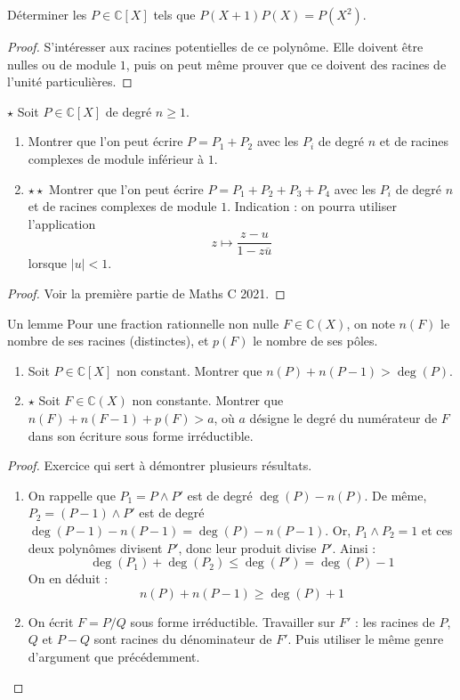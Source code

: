 \documentclass[french,a4paper]{article}
\newcommand{\C}{\mathbb{C}}
\theoremstyle{plain}
\theoremstyle{definition}
\theoremstyle{remark}
\begin{document}
\begin{ex}{}
	Déterminer les $P\in\C[X]$ tels que $P(X+1)P(X)=P(X^2)$.
\end{ex}
\begin{proof}
	S'intéresser aux racines potentielles de ce polynôme. Elle doivent être nulles ou de module $1$, puis on peut même prouver que ce doivent des racines de l'unité particulières.
\end{proof}

\begin{ex}{$\star$}
	Soit $P\in\C[X]$ de degré $n\geqslant 1$.
	\begin{enumerate}
		\item Montrer que l'on peut écrire $P=P_1+P_2$ avec les $P_i$ de degré $n$ et de racines complexes de module inférieur à $1$.
		\item $\star\star$ Montrer que l'on peut écrire $P=P_1+P_2+P_3+P_4$ avec les $P_i$ de degré $n$ et de racines complexes de module $1$. Indication : on pourra utiliser l'application $$z\mapsto\frac{z-u}{1-z\overline{u}}$$ lorsque $\lvert u\rvert <1$.
	\end{enumerate}
\end{ex}
\begin{proof}
	Voir la première partie de Maths C 2021.
\end{proof}

\begin{ex}{Un lemme}
	Pour une fraction rationnelle non nulle $F\in\C(X)$, on note $n(F)$ le nombre de ses racines (distinctes), et $p(F)$ le nombre de ses pôles.
	\begin{enumerate}
		\item Soit $P\in\C[X]$ non constant. Montrer que $n(P)+n(P-1)>\deg(P)$.
		\item $\star$ Soit $F\in\C(X)$ non constante. Montrer que $n(F)+n(F-1)+p(F)>a$, où $a$ désigne le degré du numérateur de $F$ dans son écriture sous forme irréductible.
	\end{enumerate}
\end{ex}
\begin{proof}
	Exercice qui sert à démontrer plusieurs résultats.
	\begin{enumerate}
		\item On rappelle que $P_1=P\wedge P'$ est de degré $\deg(P)-n(P)$. De même, $P_2=(P-1)\wedge P'$ est de degré $\deg(P-1)-n(P-1)=\deg(P)-n(P-1)$. Or, $P_1\wedge P_2=1$ et ces deux polynômes divisent $P'$, donc leur produit divise $P'$. Ainsi : $$\deg(P_1)+\deg(P_2)\leqslant\deg(P')=\deg(P)-1$$ On en déduit : $$n(P)+n(P-1)\geqslant \deg(P)+1$$
		\item On écrit $F=P/Q$ sous forme irréductible. Travailler sur $F'$ : les racines de $P$, $Q$ et $P-Q$ sont racines du dénominateur de $F'$. Puis utiliser le même genre d'argument que précédemment.
	\end{enumerate}
\end{proof}
\end{document}
